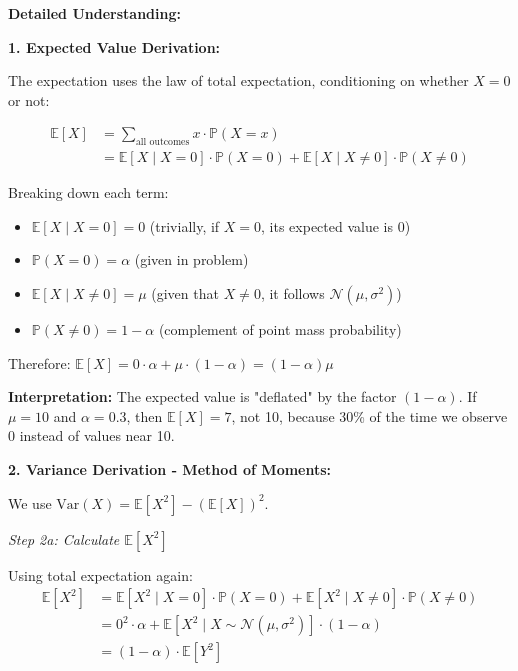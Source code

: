 \documentclass[12pt]{article}
\begin{document}
\begin{explanation}
\textbf{Detailed Understanding:}

\textbf{1. Expected Value Derivation:}

The expectation uses the law of total expectation, conditioning on whether \(X = 0\) or not:

\begin{align*}
\mathbb{E}[X] &= \sum_{\text{all outcomes}} x \cdot \mathbb{P}(X = x) \\
&= \mathbb{E}[X \mid X = 0] \cdot \mathbb{P}(X = 0) + \mathbb{E}[X \mid X \neq 0] \cdot \mathbb{P}(X \neq 0)
\end{align*}

Breaking down each term:
\begin{itemize}
    \item \(\mathbb{E}[X \mid X = 0] = 0\) (trivially, if \(X = 0\), its expected value is 0)
    \item \(\mathbb{P}(X = 0) = \alpha\) (given in problem)
    \item \(\mathbb{E}[X \mid X \neq 0] = \mu\) (given that \(X \neq 0\), it follows \(\mathcal{N}(\mu, \sigma^2)\))
    \item \(\mathbb{P}(X \neq 0) = 1 - \alpha\) (complement of point mass probability)
\end{itemize}

Therefore: \(\mathbb{E}[X] = 0 \cdot \alpha + \mu \cdot (1-\alpha) = (1-\alpha)\mu\)

\textbf{Interpretation:} The expected value is "deflated" by the factor \((1-\alpha)\). If \(\mu = 10\) and \(\alpha = 0.3\), then \(\mathbb{E}[X] = 7\), not 10, because 30\% of the time we observe 0 instead of values near 10.

\textbf{2. Variance Derivation - Method of Moments:}

We use \(\text{Var}(X) = \mathbb{E}[X^2] - (\mathbb{E}[X])^2\).

\textit{Step 2a: Calculate \(\mathbb{E}[X^2]\)}

Using total expectation again:
\begin{align*}
\mathbb{E}[X^2] &= \mathbb{E}[X^2 \mid X = 0] \cdot \mathbb{P}(X = 0) + \mathbb{E}[X^2 \mid X \neq 0] \cdot \mathbb{P}(X \neq 0) \\
&= 0^2 \cdot \alpha + \mathbb{E}[X^2 \mid X \sim \mathcal{N}(\mu, \sigma^2)] \cdot (1-\alpha) \\
&= (1-\alpha) \cdot \mathbb{E}[Y^2]
\end{align*}


\end{explanation}
\end{document}
